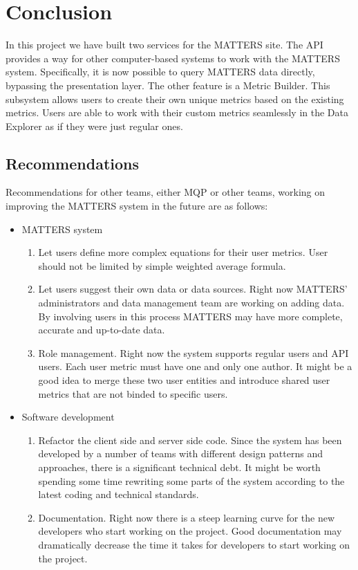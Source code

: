 \chapter{Conclusion}

	In this project we have built two services for the MATTERS site. The API 
	provides a way for other computer-based systems to work with the MATTERS 
	system. Specifically, it is now possible to query MATTERS data directly, 
	bypassing the presentation layer. The other feature is a Metric Builder. 
	This subsystem allows users to create their own unique metrics based on 
	the existing metrics. Users are able to work with their custom metrics seamlessly 
	in the Data Explorer as if they were just regular ones.  

	\section{Recommendations}
		
		Recommendations for other teams, either MQP or other teams, working on improving the MATTERS system in the future are as follows:
		
		\begin{itemize}
			\item MATTERS system
				\begin{enumerate}
					\item
						Let users define more complex equations for their user metrics.
						User should not be limited by simple weighted average formula.
					\item
						Let users suggest their own data or data sources. Right now 
						MATTERS' administrators and data management team are working on
						adding data. By involving users in this process MATTERS may have 
						more complete, accurate and up-to-date data.
					\item
						Role management. Right now the system supports regular users and API users. 
						Each user metric must have one and only one author. It might be a good idea 
						to merge these two user entities and introduce shared user metrics that are 
						not binded to specific users.
				\end{enumerate}
			\item Software development
				\begin{enumerate}
					\item
						Refactor the client side and server side code. Since the system 
						has been developed by a number of teams with different design 
						patterns and approaches, there is a significant technical debt. 
						It might be worth spending some time rewriting some parts of the system 
						according to the latest coding and technical standards.
					\item
						Documentation. Right now there is a steep learning curve for the new 
						developers who start working on the project. Good documentation may 
						dramatically decrease the time it takes for developers to start working 
						on the project.
				\end{enumerate}
		\end{itemize}
